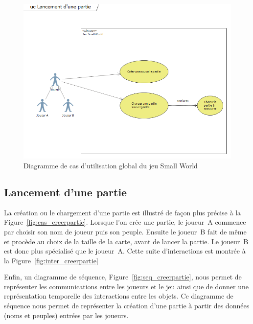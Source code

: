 \documentclass[a4paper]{article}%
\begin{document}
\begin{figure}[H]
    \centering
    \includegraphics[width=\textwidth]{./images/cas_dutilisation/jeuglobal.png}
		\caption{Diagramme de cas d'utilisation global du jeu Small World}
		\label{fig:jeuglobal}
\end{figure}

\subsection{Lancement d'une partie}

La création ou le chargement d'une partie est illustré de façon plus précise à la Figure~\ref{fig:cas_creerpartie}.
Lorsque l'on crée une partie, le joueur~A commence par choisir son nom de joueur puis son peuple. Ensuite le joueur~B fait de même et procède au choix de la taille de la carte, avant de lancer la partie. Le joueur~B est donc plus spécialisé que le joueur~A. Cette suite d'interactions est montrée à la Figure~\ref{fig:inter_creerpartie}

Enfin, un diagramme de séquence, Figure~\ref{fig:seq_creerpartie}, nous permet de représenter les communications entre les joueurs et le jeu ainsi que de donner une représentation temporelle des interactions entre les objets. Ce diagramme de séquence nous permet de représenter la création d'une partie à partir des données (noms et peuples) entrées par les joueurs.
\end{document}
